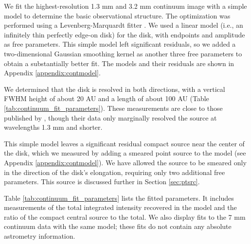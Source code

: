 \documentclass[twocolumn]{aastex61}
\newcommand{\sourcei}{SrcI\xspace}
\begin{document}

We fit the highest-resolution 1.3 mm and 3.2 mm continuum image with a simple
model to determine the basic
observational structure.
The optimization was performed using a Levenberg-Marquardt
fitter \citep{Newville2014a}. 
We used a linear model (i.e., an infinitely thin
perfectly edge-on disk) for the disk, with endpoints and amplitude as free parameters.
This simple model left significant residuals, so we added a two-dimensional
Gaussian smoothing kernel as another three free parameters to obtain a
substantially better fit.
The models and their residuals
are shown in Appendix \ref{appendix:contmodel}.

We determined that the disk is resolved in both
directions, with a vertical FWHM height of about 20 AU and a length of about
100 AU (Table \ref{tab:continuum_fit_parameters}).  These measurements
are close to those published by \citet{Plambeck2016a}, though their data
only marginally resolved the source at wavelengths 1.3 mm and shorter.

This simple model leaves a significant residual compact source near the center
of the disk, which we measured by adding a smeared point source to the model
(see Appendix \ref{appendix:contmodel}).  We have allowed the source to be
smeared only in the direction of the disk's elongation, requiring only two
additional free parameters.  This source is discussed further in Section
\ref{sec:ptsrc}.

Table \ref{tab:continuum_fit_parameters} lists the fitted parameters.  It 
includes measurements of the total integrated intensity recovered in the model
and the ratio of the compact central source to the total.  We also display
fits to the \citet{Reid2007a} 7 mm continuum data with the same model;
these fits do not contain any absolute astrometry information.
\end{document}
